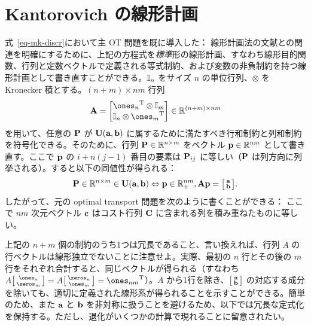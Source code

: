 \section{Kantorovich の線形計画}\label{s-kantorovich}
式~\eqref{eq-mk-discr}において主 OT 問題を既に導入した：
線形計画法の文献との関連を明確にするために、上記の方程式を\emph{標準}形の線形計画、すなわち線形目的関数、行列と定数ベクトルで定義される等式制約、および変数の非負制約を持つ線形計画として書き直すことができる。$\Identity_n$ をサイズ $n$ の単位行列、$\otimes$ を Kronecker 積とする。${(n+m) \times nm}$ 行列
$$
\mathbf{A}= \begin{bmatrix}
	\transp{\ones_{n}} \otimes \Identity_m \\
	\Identity_n \otimes \transp{\ones_{m}}
\end{bmatrix}\in\RR^{(n+m)\times nm}
$$
を用いて、任意の $\P$ が $\CouplingsD(\a,\b)$ に属するために満たすべき行和制約と列和制約を符号化できる。そのために、行列 $\P\in\RR^{n\times m}$ をベクトル $\p\in\RR^{nm}$ として書き直す。ここで $\p$ の $i+n(j-1)$ 番目の要素は $\P_{ij}$ に等しい（$\P$ は列方向に列挙される）。すると以下の同値性が得られる：
$$\P\in \RR^{n\times m}\in \CouplingsD(\a,\b) \Leftrightarrow \p\in\RR^{nm}_+, \mathbf{A}\p = \bigl[\begin{smallmatrix}\a\\ \b \end{smallmatrix} \bigr].$$
したがって、元の optimal transport 問題を次のように書くことができる：
ここで $nm$ 次元ベクトル $\cc$ はコスト行列 $\C$ に含まれる列を積み重ねたものに等しい。

\begin{rem}\label{rem-transportation-polytope} 上記の $n+m$ 個の制約のうち1つは冗長であること、言い換えれば、行列 $A$ の行ベクトルは線形独立でないことに注意せよ。実際、最初の $n$ 行とその後の $m$ 行をそれぞれ合計すると、同じベクトルが得られる（すなわち $A \bigl[\begin{smallmatrix} \ones_n\\\zeros_m \end{smallmatrix}\bigr] = A \bigl[\begin{smallmatrix} \zeros_n\\\ones_m\end{smallmatrix}\bigr]=\transp{\ones_{nm}}$）。$A$ から1行を除き、$\bigl[\begin{smallmatrix}\a\\ \b \end{smallmatrix}\bigr]$ の対応する成分を除いても、適切に定義された線形系が得られることを示すことができる。簡単のため、また $\a$ と $\b$ を非対称に扱うことを避けるため、以下では冗長な定式化を保持する。ただし、退化がいくつかの計算で現れることに留意されたい。\end{rem}

